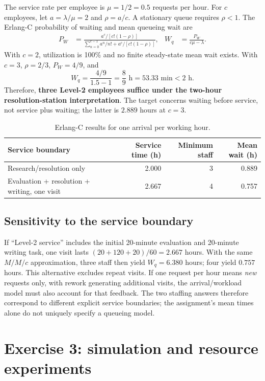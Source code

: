 \documentclass[10pt,a4paper]{article}
\begin{document}
The service rate per employee is $\mu=1/2=0.5$ requests per hour. For $c$ employees,
let $a=\lambda/\mu=2$ and $\rho=a/c$. A stationary queue requires $\rho<1$.
The Erlang-C probability of waiting and mean queueing wait are
\begin{align*}
 P_W&=\frac{a^c/[c!(1-\rho)]}
 {\displaystyle\sum_{n=0}^{c-1}a^n/n!+a^c/[c!(1-\rho)]},&
 W_q&=\frac{P_W}{c\mu-\lambda}.
\end{align*}
With $c=2$, utilization is 100\% and no finite steady-state mean wait exists.
With $c=3$, $\rho=2/3$, $P_W=4/9$, and
\[
 W_q=\frac{4/9}{1.5-1}=\frac89\text{ h}=53.33\text{ min}<2\text{ h}.
\]
Therefore, \textbf{three Level-2 employees suffice under the two-hour
resolution-station interpretation}. The target concerns waiting before service,
not service plus waiting; the latter is $2.889$ hours at $c=3$.

\begin{table}[htbp]
\centering\small
\caption{Erlang-C results for one arrival per working hour.}
\begin{tabular}{lrrr}
\toprule
Service boundary & Service time (h) & Minimum staff & Mean wait (h)\\
\midrule
Research/resolution only & 2.000 & 3 & 0.889\\
Evaluation + resolution + writing, one visit & 2.667 & 4 & 0.757\\
\bottomrule
\end{tabular}
\end{table}

\subsection{Sensitivity to the service boundary}
If ``Level-2 service'' includes the initial 20-minute evaluation and 20-minute
writing task, one visit lasts $(20+120+20)/60=2.667$ hours. With the same $M/M/c$
approximation, three staff then yield $W_q=6.380$ hours; four yield $0.757$ hours.
This alternative excludes repeat visits. If one request per hour means \emph{new}
requests only, with rework generating additional visits, the arrival/workload model
must also account for that feedback. The two staffing answers therefore correspond
to different explicit service boundaries; the assignment's mean times alone do not
uniquely specify a queueing model.

\section{Exercise 3: simulation and resource experiments}
\end{document}
